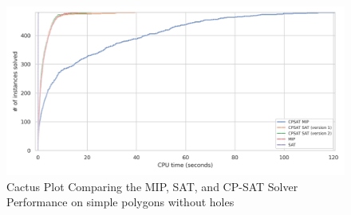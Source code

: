 \begin{figure}[htbp]
\centering
\includegraphics[scale=0.7]{Thesis/figures/final_benchmark_cactus_plot_runtime_MIP_SAT_CPSAT_without_holes.png}
\caption{Cactus Plot Comparing the MIP, SAT, and CP-SAT Solver Performance on simple polygons without holes}
\label{fig:cactus_all_simple_no_holes}
\end{figure}

